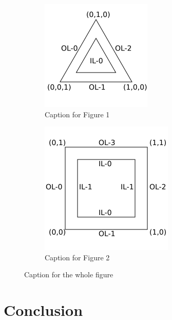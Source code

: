 \documentclass{report}
\begin{document}
\begin{figure}[h!]
  \centering
  \begin{subfigure}[h]{0.45\textwidth}
    \includegraphics[width=\textwidth]{img/triangle-patch.png}
    \caption{Caption for Figure 1}
    \label{fig:figure1}
  \end{subfigure}
  \hfill
  \begin{subfigure}[h]{0.45\textwidth}
    \includegraphics[width=\textwidth]{img/quad-patch.png}
    \caption{Caption for Figure 2}
    \label{fig:figure2}
  \end{subfigure}
  \caption{Caption for the whole figure}
  \label{fig:both_figures}
\end{figure}

\chapter{Conclusion}
\label{ch:conclusion}
\lipsum[7-8]



\end{document}
